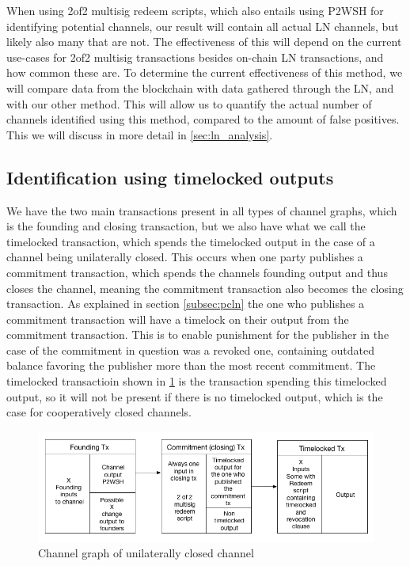 When using 2of2 multisig redeem scripts, which also entails using P2WSH  for identifying potential channels, our result will contain all actual LN channels, but likely also many that are not. The effectiveness of this will depend on the current use-cases for 2of2 multisig transactions besides on-chain LN transactions, and how common these are. To determine the current effectiveness of this method, we will compare data from the blockchain with data gathered through the LN, and with our other method. This will allow us to quantify the actual number of channels identified using this method, compared to the amount of false positives.
This we will discuss in more detail in \cref{sec:ln_analysis}. 

\subsection{Identification using timelocked outputs}
\label{timelocked_identification}

We have the two main transactions present in all types of channel graphs, which is the founding and closing transaction, but we also have what we call the timelocked transaction, which spends the timelocked output in the case of a channel being unilaterally closed.
This occurs when one party publishes a commitment transaction, which spends the channels founding output and thus closes the channel, meaning the commitment transaction also becomes the closing transaction. As explained in section \cref{subsec:pcln} the one who publishes a commitment transaction will have a timelock on their output from the commitment transaction. This is to enable punishment for the publisher in the case of the commitment in question was a revoked one, containing outdated balance favoring the publisher more than the most recent commitment. 
The timelocked transactioin shown in \cref{fig:ln_tx_graph} is the transaction spending this timelocked output, so it will not be present if there is no timelocked output, which is the case for cooperatively closed channels.
\\




\begin{figure}[h]
    \centering
    \includegraphics[width=15cm]{figures/chan_graph.png}
    \caption{Channel graph of unilaterally closed channel}
    \label{fig:ln_tx_graph}
\end{figure}

